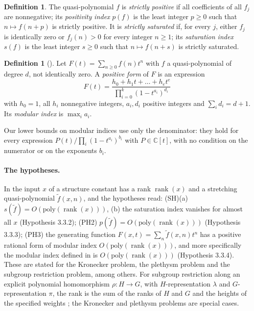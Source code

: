 \documentclass[11pt,a4paper]{article}
\theoremstyle{definition}
\newtheorem{definition}[theorem]{Definition}
\newcommand{\C}{\mathbb{C}}
\newcommand{\rank}{\operatorname{rank}}
\begin{document}
\begin{definition}\label{def:indices}
The quasi-polynomial $f$ is \emph{strictly positive} if all coefficients of
all $f_j$ are nonnegative; its \emph{positivity index} $p(f)$ is the least
integer $p\ge0$ such that $n\mapsto f(n+p)$ is strictly positive. It is
\emph{strictly saturated} if, for every $j$, either $f_j$ is identically zero
or $f_j(n)>0$ for every integer $n\ge1$; its \emph{saturation index} $s(f)$ is
the least integer $s\ge0$ such that $n\mapsto f(n+s)$ is strictly saturated.
\end{definition}

\begin{definition}[{\cite[Definition 1.2.7, p.~15]{GCT6}}]\label{def:positiveform}
Let $F(t)=\sum_{n\ge0}f(n)t^n$ with $f$ a quasi-polynomial of degree $d$, not
identically zero. A \emph{positive form} of $F$ is an expression
\[
 F(t)=\frac{h_0+h_1t+\dots+h_et^e}{\prod_{i=0}^k(1-t^{a_i})^{d_i}}
\]
with $h_0=1$, all $h_i$ nonnegative integers, $a_i,d_i$ positive integers and
$\sum_id_i=d+1$. Its \emph{modular index} is $\max_ia_i$.
\end{definition}

Our lower bounds on modular indices use only the denominator: they hold for
every expression $P(t)/\prod_i(1-t^{a_i})^{b_i}$ with $P\in\C[t]$, with no
condition on the numerator or on the exponents $b_i$.

\paragraph{The hypotheses.}
In \cite[Section 3.3, p.~51]{GCT6} the input $x$ of a structure constant has a
rank $\rank(x)$ and a stretching quasi-polynomial $\tilde f(x,n)$, and the
hypotheses read: (SH)(a) $s(\tilde f)=O(\mathrm{poly}(\rank(x)))$, (b) the
saturation index vanishes for almost all $x$ (Hypothesis 3.3.2); (PH2)
$p(\tilde f)=O(\mathrm{poly}(\rank(x)))$ (Hypothesis 3.3.3); (PH3) the
generating function $F(x,t)=\sum_n\tilde f(x,n)t^n$ has a positive rational
form of modular index $O(\mathrm{poly}(\rank(x)))$, and more specifically the
modular index defined in \cite[Section 4.1.1]{GCT6} is
$O(\mathrm{poly}(\rank(x)))$ (Hypothesis 3.3.4). These are stated for the
Kronecker problem, the plethysm problem and the subgroup restriction problem,
among others. For subgroup restriction along an explicit polynomial
homomorphism $\rho:H\to G$, with $H$-representation $\lambda$ and
$G$-representation $\pi$, the rank is the sum of the ranks of $H$ and $G$ and
the heights of the specified weights \cite[Section 3.4, p.~52]{GCT6}; the
Kronecker and plethysm problems are special cases.
\end{document}
